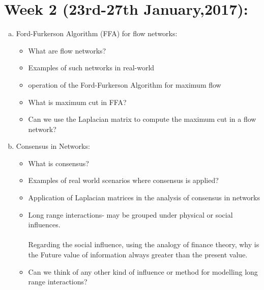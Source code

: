 \documentclass[10pt,a4paper]{article}
\begin{document}
\section*{Week 2 (23rd-27th January,2017):}
\begin{enumerate}[a)]
\item Ford-Furkerson Algorithm (FFA) for flow networks:
\begin{itemize}
\item What are flow networks?
\item Examples of such networks in real-world
\item operation of the Ford-Furkerson Algorithm for maximum flow
\item What is maximum cut in FFA?
\item Can we use the Laplacian matrix to compute the maximum cut in a flow network? 
\end{itemize}
\item Consensus in Networks:
\begin{itemize}
\item What is consensus?
\item Examples of real world scenarios where consensus is applied?
\item Application of Laplacian matrices in the analysis of consensus in networks
\item Long range interactions- may be grouped under physical or social influences. \\\\
Regarding the social influence, using the analogy of finance theory, why is the Future value of information always greater than the present value.
\item Can we think of any other kind of influence or method for modelling long range interactions?
\end{itemize}
\end{enumerate}
\end{document}
